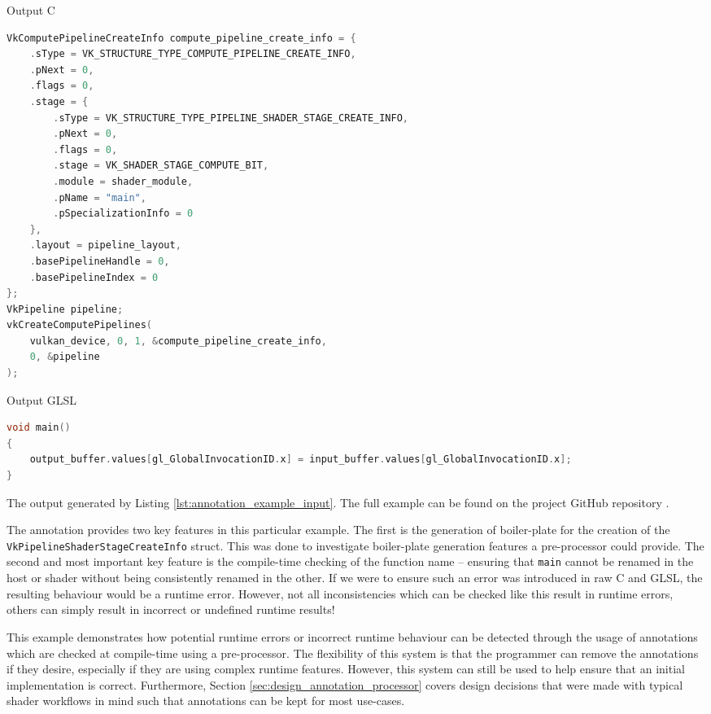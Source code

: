 \documentclass[a4paper,12pt,twoside,openright]{report}
\begin{document}
\begin{lstfloat}
\begin{center} Output C \end{center}
\begin{lstlisting}[language=C]
VkComputePipelineCreateInfo compute_pipeline_create_info = {
    .sType = VK_STRUCTURE_TYPE_COMPUTE_PIPELINE_CREATE_INFO,
    .pNext = 0,
    .flags = 0,
    .stage = {
        .sType = VK_STRUCTURE_TYPE_PIPELINE_SHADER_STAGE_CREATE_INFO,
        .pNext = 0,
        .flags = 0,
        .stage = VK_SHADER_STAGE_COMPUTE_BIT,
        .module = shader_module,
        .pName = "main",
        .pSpecializationInfo = 0
    },
    .layout = pipeline_layout,
    .basePipelineHandle = 0,
    .basePipelineIndex = 0
};
VkPipeline pipeline;
vkCreateComputePipelines(
    vulkan_device, 0, 1, &compute_pipeline_create_info,
    0, &pipeline
);
\end{lstlisting}
\begin{center} Output GLSL \end{center}
\begin{lstlisting}[language=C]
void main()
{
    output_buffer.values[gl_GlobalInvocationID.x] = input_buffer.values[gl_GlobalInvocationID.x];
}
\end{lstlisting}
\caption{The output generated by Listing \ref{lst:annotation_example_input}. The full
example can be found on the project GitHub repository \cite{ProjectSource}.}
\label{lst:annotation_example_output}
\end{lstfloat}

The annotation provides two key features in this particular example. The first
is the generation of boiler-plate for the creation of the
\texttt{VkPipelineShaderStageCreateInfo} struct. This was done to investigate
boiler-plate generation features a pre-processor could provide. The second and
most important key feature is the compile-time checking of the function name --
ensuring that \texttt{main} cannot be renamed in the host or shader without
being consistently renamed in the other. If we were to ensure such an error was
introduced in raw C and GLSL, the resulting behaviour would be a runtime error.
However, not all inconsistencies which can be checked like this result in
runtime errors, others can simply result in incorrect or undefined runtime
results!

This example demonstrates how potential runtime errors or incorrect runtime
behaviour can be detected through the usage of annotations which are checked at
compile-time using a pre-processor. The flexibility of this system is that the
programmer can remove the annotations if they desire, especially if they are
using complex runtime features. However, this system can still be used to help
ensure that an initial implementation is correct. Furthermore, Section
\ref{sec:design_annotation_processor} covers design decisions that were made
with typical shader workflows in mind such that annotations can be kept for
most use-cases.
\end{document}
